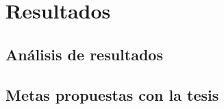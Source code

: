 \section{Resultados}
    \subsection{Análisis de resultados}
    \subsection{Metas propuestas con la tesis}